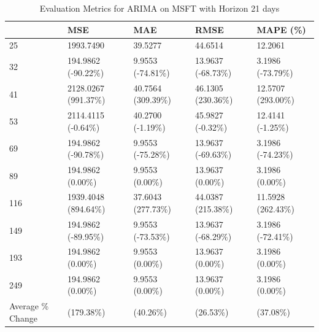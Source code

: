 \begin{table}
\caption{Evaluation Metrics for ARIMA on MSFT with Horizon 21 days}
\label{tab:arima_MSFT_h21_metrics}
\begin{tabular}{lllll}
\toprule
 & MSE & MAE & RMSE & MAPE (\%) \\
\midrule
25 & 1993.7490 & 39.5277 & 44.6514 & 12.2061 \\
32 & 194.9862 (-90.22\%) & 9.9553 (-74.81\%) & 13.9637 (-68.73\%) & 3.1986 (-73.79\%) \\
41 & 2128.0267 (991.37\%) & 40.7564 (309.39\%) & 46.1305 (230.36\%) & 12.5707 (293.00\%) \\
53 & 2114.4115 (-0.64\%) & 40.2700 (-1.19\%) & 45.9827 (-0.32\%) & 12.4141 (-1.25\%) \\
69 & 194.9862 (-90.78\%) & 9.9553 (-75.28\%) & 13.9637 (-69.63\%) & 3.1986 (-74.23\%) \\
89 & 194.9862 (0.00\%) & 9.9553 (0.00\%) & 13.9637 (0.00\%) & 3.1986 (0.00\%) \\
116 & 1939.4048 (894.64\%) & 37.6043 (277.73\%) & 44.0387 (215.38\%) & 11.5928 (262.43\%) \\
149 & 194.9862 (-89.95\%) & 9.9553 (-73.53\%) & 13.9637 (-68.29\%) & 3.1986 (-72.41\%) \\
193 & 194.9862 (0.00\%) & 9.9553 (0.00\%) & 13.9637 (0.00\%) & 3.1986 (0.00\%) \\
249 & 194.9862 (0.00\%) & 9.9553 (0.00\%) & 13.9637 (0.00\%) & 3.1986 (0.00\%) \\
Average \% Change & (179.38\%) & (40.26\%) & (26.53\%) & (37.08\%) \\
\bottomrule
\end{tabular}
\end{table}
